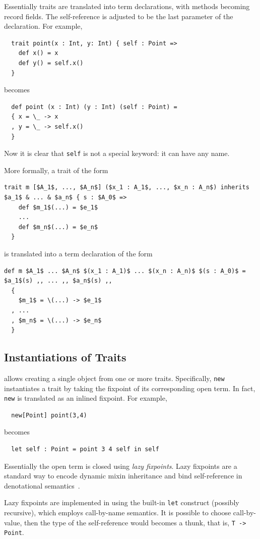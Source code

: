 Essentially traits are translated into term declarations, with methods becoming
record fields. The self-reference is adjusted to be the last parameter of the
declaration. For example,
\begin{lstlisting}
  trait point(x : Int, y: Int) { self : Point =>
    def x() = x
    def y() = self.x()
  }
\end{lstlisting}
becomes
\begin{lstlisting}
  def point (x : Int) (y : Int) (self : Point) =
  { x = \_ -> x
  , y = \_ -> self.x()
  }
\end{lstlisting}

Now it is clear that \lstinline{self} is not a special keyword: it can
have any name.

More formally, a trait of the form
\begin{lstlisting}[mathescape=true]
  trait m [$A_1$, ..., $A_n$] ($x_1 : A_1$, ..., $x_n : A_n$) inherits $a_1$ & ... & $a_n$ { s : $A_0$ =>
    def $m_1$(...) = $e_1$
    ...
    def $m_n$(...) = $e_n$
  }
\end{lstlisting}
is translated into a term declaration of the form
\begin{lstlisting}[mathescape=true]
  def m $A_1$ ... $A_n$ $(x_1 : A_1)$ ... $(x_n : A_n)$ $(s : A_0)$ = $a_1$(s) ,, ... ,, $a_n$(s) ,,
  {
    $m_1$ = \(...) -> $e_1$
  , ...
  , $m_n$ = \(...) -> $e_n$
  }
\end{lstlisting}


\subsection{Instantiations of Traits}

\name allows creating a single object from one or more traits. Specifically,
\lstinline{new} instantiates a trait by taking the fixpoint of its
corresponding open term. In fact, \lstinline{new} is translated as an inlined
fixpoint. For example,
\begin{lstlisting}
  new[Point] point(3,4)
\end{lstlisting}
becomes
\begin{lstlisting}
  let self : Point = point 3 4 self in self
\end{lstlisting}
Essentially the open term is closed using \textit{lazy fixpoints}. Lazy
fixpoints are a standard way to encode dynamic mixin inheritance and bind
self-reference in denotational semantics~\cite{cook1989denotational}.

Lazy fixpoints are implemented in \name using the built-in \lstinline{let}
construct (possibly recursive), which employs call-by-name semantics. It is
possible to choose call-by-value, then the type of the self-reference would
becomes a thunk, that is, \lstinline$T -> Point$.

